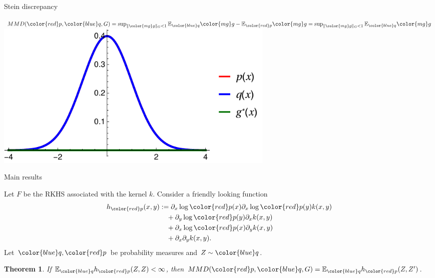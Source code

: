 \documentclass{beamer}
\newtheorem{thm}{Theorem}
\begin{document}
 \begin{frame}{Stein discrepancy}
 \begin{center}
 
$MMD({\color{red} p},{ \color{blue} q},G) = \sup_{   \| {\color{mg} g} \|_G<1} \ev_{{ \color{blue} q}}{\color{mg}g} - \ev_{{\color{red} p}} {\color{mg}g}  = \sup_{ \| {\color{mg} g} \|_G<1} \ev_{{ \color{blue} q}} {\color{mg}g} $  \\
\vspace{0.5cm}
 \includegraphics[width=0.6\textwidth]{./img/s0.pdf} 
 \end{center}
 \end{frame} 
 
 
 
\begin{frame}{Main results}
\begin{center}
 Let $F$ be the RKHS associated with the kernel $k$. Consider a friendly looking function
\begin{align*}
h_{{\color{red} p}}(x,y) & := \partial_{x} \log {\color{red} p}(x) \partial_{x} \log {\color{red} p}(y) k(x,y)\\
 & \quad+\partial_{y} \log {\color{red} p}(y) \partial_{x}  k(x,y)\\
 & \quad+\partial_{x} \log {\color{red} p}(x) \partial_{y}k(x,y)\\
 & \quad+\partial_{x} \partial_{y} k(x,y).
\end{align*}
Let ${ \color{blue} q},{\color{red} p}$ be probability measures and $Z\sim { \color{blue} q}$. 

\end{center}
\begin{thm}
If $\ev_{{ \color{blue} q}} h_{{\color{red} p}}(Z,Z)<\infty$, then $MMD({\color{red} p},{ \color{blue} q},G) = \ev_{{ \color{blue} q}} h_{{\color{red} p}}(Z,Z')$.
\end{thm}
\end{frame}
 
\end{document}
